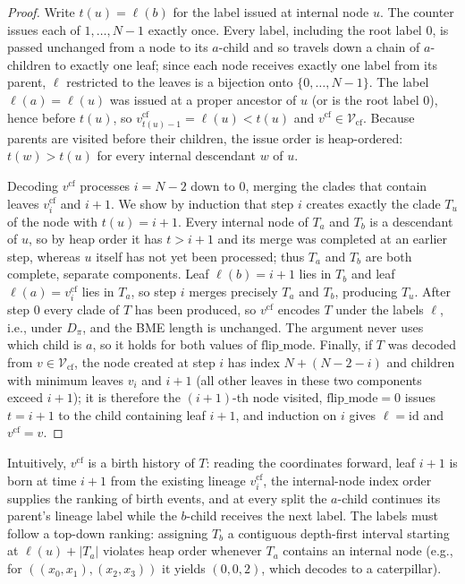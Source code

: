 \documentclass[11pt,a4paper]{article}
\theoremstyle{definition}
\begin{document}
\begin{proof}
Write $t(u) = \ell(b)$ for the label issued at internal node $u$. The counter issues each of $1, \dots, N-1$ exactly once. Every label, including the root label $0$, is passed unchanged from a node to its $a$-child and so travels down a chain of $a$-children to exactly one leaf; since each node receives exactly one label from its parent, $\ell$ restricted to the leaves is a bijection onto $\{0, \dots, N-1\}$. The label $\ell(a) = \ell(u)$ was issued at a proper ancestor of $u$ (or is the root label $0$), hence before $t(u)$, so $v^{\text{cf}}_{t(u)-1} = \ell(u) < t(u)$ and $v^{\text{cf}} \in \mathcal{V}_{\text{cf}}$. Because parents are visited before their children, the issue order is heap-ordered: $t(w) > t(u)$ for every internal descendant $w$ of $u$.

Decoding $v^{\text{cf}}$ processes $i = N-2$ down to $0$, merging the clades that contain leaves $v^{\text{cf}}_i$ and $i+1$. We show by induction that step $i$ creates exactly the clade $T_u$ of the node with $t(u) = i + 1$. Every internal node of $T_a$ and $T_b$ is a descendant of $u$, so by heap order it has $t > i + 1$ and its merge was completed at an earlier step, whereas $u$ itself has not yet been processed; thus $T_a$ and $T_b$ are both complete, separate components. Leaf $\ell(b) = i + 1$ lies in $T_b$ and leaf $\ell(a) = v^{\text{cf}}_i$ lies in $T_a$, so step $i$ merges precisely $T_a$ and $T_b$, producing $T_u$. After step $0$ every clade of $T$ has been produced, so $v^{\text{cf}}$ encodes $T$ under the labels $\ell$, i.e., under $D_\pi$, and the BME length is unchanged. The argument never uses which child is $a$, so it holds for both values of $\text{flip\_mode}$. Finally, if $T$ was decoded from $v \in \mathcal{V}_{\text{cf}}$, the node created at step $i$ has index $N + (N-2-i)$ and children with minimum leaves $v_i$ and $i + 1$ (all other leaves in these two components exceed $i+1$); it is therefore the $(i+1)$-th node visited, $\text{flip\_mode} = 0$ issues $t = i + 1$ to the child containing leaf $i+1$, and induction on $i$ gives $\ell = \text{id}$ and $v^{\text{cf}} = v$.
\end{proof}
Intuitively, $v^{\text{cf}}$ is a birth history of $T$: reading the coordinates forward, leaf $i+1$ is born at time $i+1$ from the existing lineage $v^{\text{cf}}_i$, the internal-node index order supplies the ranking of birth events, and at every split the $a$-child continues its parent's lineage label while the $b$-child receives the next label. The labels must follow a top-down ranking: assigning $T_b$ a contiguous depth-first interval starting at $\ell(u) + |T_a|$ violates heap order whenever $T_a$ contains an internal node (e.g., for $((x_0, x_1), (x_2, x_3))$ it yields $(0, 0, 2)$, which decodes to a caterpillar).
\end{document}
